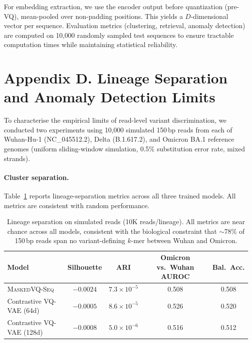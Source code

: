 \documentclass[pmlr]{jmlr}%
\newcommand{\ours}{\textsc{MaskedVQ-Seq}}
\begin{document}
For embedding extraction, we use the encoder output before quantization (pre-VQ), mean-pooled over non-padding positions. This yields a $D$-dimensional vector per sequence. Evaluation metrics (clustering, retrieval, anomaly detection) are computed on 10,000 randomly sampled test sequences to ensure tractable computation times while maintaining statistical reliability.

\section*{Appendix D. Lineage Separation and Anomaly Detection Limits}
\label{app:lineage_separation}

To characterise the empirical limits of read-level variant discrimination, we conducted two experiments using 10,000 simulated 150\,bp reads from each of Wuhan-Hu-1 (NC\_045512.2), Delta (B.1.617.2), and Omicron BA.1 reference genomes (uniform sliding-window simulation, 0.5\% substitution error rate, mixed strands).

\paragraph{Cluster separation.}
Table~\ref{tab:lineage_sep} reports lineage-separation metrics across all three trained models. All metrics are consistent with random performance.

\begin{table}[!ht]
  \centering
  \caption{Lineage separation on simulated reads (10K reads/lineage). All metrics are near chance across all models, consistent with the biological constraint that $\sim$78\% of 150\,bp reads span no variant-defining $k$-mer between Wuhan and Omicron.}
  \label{tab:lineage_sep}
  \small
  \begin{tabular}{lcccc}
  \toprule
  \textbf{Model} & \textbf{Silhouette} & \textbf{ARI} & \textbf{Omicron vs.\ Wuhan AUROC} & \textbf{Bal.\ Acc.} \\
  \midrule
  \ours{}                   & $-0.0024$ & $7.3\times10^{-5}$ & 0.508 & 0.508 \\
  Contrastive VQ-VAE (64d)  & $-0.0005$ & $8.6\times10^{-5}$ & 0.526 & 0.520 \\
  Contrastive VQ-VAE (128d) & $-0.0008$ & $5.0\times10^{-6}$ & 0.516 & 0.512 \\
  \bottomrule
  \end{tabular}
\end{table}
\end{document}
